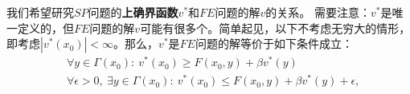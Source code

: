 我们希望研究$SP$问题的\textbf{上确界函数}$v^*$和$FE$问题的解$v$的关系。
需要注意：$v^*$是唯一定义的，但$FE$问题的解$v$可能有很多个。简单起见，以下不考虑无穷大的情形，
即考虑$\left|v^*\left(x_0\right)\right| < \infty$。那么，$v^*$是$FE$问题的解等价于如下条件成立：
\begin{equation*}
    \begin{aligned}
        &\forall y \in \Gamma\left(x_0\right):
            ~ v^*\left(x_0\right)\geq F\left(x_0,y\right) + \beta v^*\left(y\right) \\
        &\forall \epsilon > 0, ~\exists y\in \Gamma\left(x_0\right):
            ~ v^*\left(x_0\right)\leq F\left(x_0,y\right) + \beta v^*\left(y\right) + \epsilon, 
    \end{aligned} 
\end{equation*}

